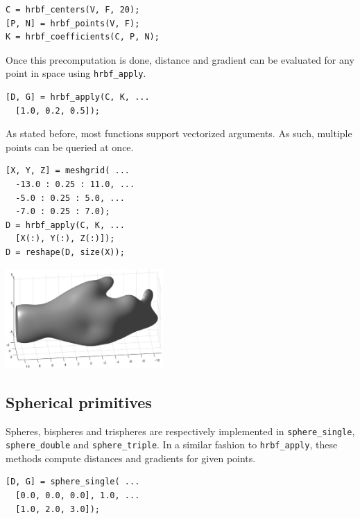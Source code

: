 \documentclass[a4paper,10pt]{article}
\begin{document}
\begin{multicols}{2}
\begin{lstlisting}
C = hrbf_centers(V, F, 20);
[P, N] = hrbf_points(V, F);
K = hrbf_coefficients(C, P, N);
\end{lstlisting}

Once this precomputation is done, distance and gradient can be evaluated for any point in space using \lstinline!hrbf_apply!.

\begin{lstlisting}
[D, G] = hrbf_apply(C, K, ...
  [1.0, 0.2, 0.5]);
\end{lstlisting}

As stated before, most functions support vectorized arguments.
As such, multiple points can be queried at once.

\begin{lstlisting}
[X, Y, Z] = meshgrid( ...
  -13.0 : 0.25 : 11.0, ...
  -5.0 : 0.25 : 5.0, ...
  -7.0 : 0.25 : 7.0);
D = hrbf_apply(C, K, ...
  [X(:), Y(:), Z(:)]);
D = reshape(D, size(X));
\end{lstlisting}

\begin{center}
\includegraphics[width=0.45\textwidth]{figs/demo_hrbf}
\end{center}


\subsection{Spherical primitives}

Spheres, bispheres and trispheres are respectively implemented in \lstinline!sphere_single!, \lstinline!sphere_double! and \lstinline!sphere_triple!.
In a similar fashion to \lstinline!hrbf_apply!, these methods compute distances and gradients for given points.

\begin{lstlisting}
[D, G] = sphere_single( ...
  [0.0, 0.0, 0.0], 1.0, ...
  [1.0, 2.0, 3.0]);
\end{lstlisting}


\end{multicols}
\end{document}
